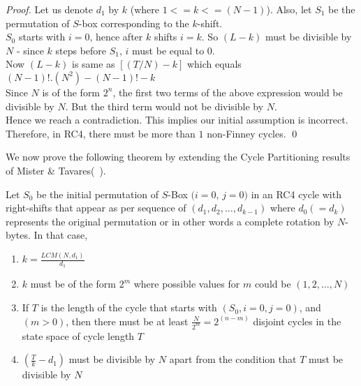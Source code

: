 \documentclass{llncs}
\begin{document}
\begin{proof}
Let us denote $d_{1}$ by $k$ (where $1<=k<=(N-1)$). Also, let $S_{1}$ be the permutation of $S$-box corresponding to the $k$-shift.\\

$S_{0}$ starts with $i=0$, hence after $k$ shifts $i=k$. So $(L-k)$ must be divisible by $N$ - since $k$ steps before $S_{1}$, $i$ must be equal to $0$.\\

Now $(L-k)$ is same as $[(T/N) - k]$ which equals $(N-1)!.(N^2) - (N-1)! - k$ \\

Since $N$ is of the form $2^n$, the first two terms of the above expression would be divisible by $N$. But the third term would not be divisible by $N$.\\ 

Hence we reach a contradiction. This implies our initial assumption is incorrect. \\

Therefore, in RC4, there must be more than $1$ non-Finney cycles. \qed

\end{proof}

We now prove the following theorem by extending the Cycle Partitioning results of Mister \& Tavares(~\cite{mister}).

\begin{theorem}
Let $S_{0}$ be the initial permutation of $S$-Box $(i=0$, $j=0)$ in an RC4 cycle with right-shifts that appear as per sequence of $(d_{1}, d_{2},..., d_{k-1})$ where $d_{0} (=d_{k})$ represents the original permutation or in other words a complete rotation by $N$-bytes. In that case,
\begin{enumerate}
    \item \hspace $k = \frac{LCM(N, d_1)}{d_1}$ 
    \item \hspace $k$ must be of the form $2^m$ where possible values for $m$ could be $(1,2,...,N)$
    \item \hspace If $T$ is the length of the cycle that starts with $(S_{0}, i=0, j=0)$, and $(m>0)$, then there must be at least $\frac{N}{2^m}=2^(n-m)$ disjoint cycles in the state space of cycle length $T$
    \item \hspace $(\frac{T}{k}-d_1)$ must be divisible by $N$ apart from the condition that $T$ must be divisible by $N$
\end{enumerate}
\end{theorem}
\end{document}
